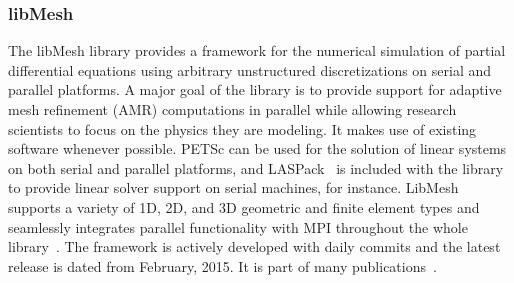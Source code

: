   
  
  
  \subsubsection{libMesh}
  The libMesh library provides a framework for the numerical simulation of partial differential equations using arbitrary unstructured discretizations on serial and parallel platforms. A major goal of the library is to provide support for adaptive mesh refinement (AMR) computations in parallel while allowing research scientists to focus on the physics they are modeling. It makes use of existing software whenever possible. PETSc can be used for the solution of linear systems on both serial and parallel platforms, and LASPack~\cite{laspack2015url} is included with the library to provide linear solver support on serial machines, for instance. LibMesh supports a variety of 1D, 2D, and 3D geometric and finite element types and seamlessly integrates parallel functionality with MPI throughout the whole library~\cite{kirk2006libmesh}. The framework is actively developed with daily commits and the latest release is dated from February, 2015. It is part of many publications~\cite{libmeshPubs}.
  
  
  
